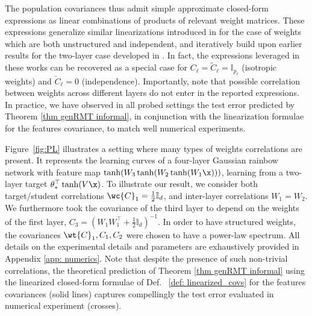 The population covariances thus admit simple approximate closed-form expressions as linear combinations of products of relevant weight matrices. These expressions generalize similar linearizations introduced in \cite{Cui2023,schroder2023deterministic, bosch2023precise, Fan2020SpectraOT,2306.05850} for the case of weights which are both unstructured and independent, and iteratively build upon earlier results for the two-layer case developed in \cite{Mei2019TheGE, Gerace2020GeneralisationEI, Goldt2021TheGE, Hu2020UniversalityLF}.  In fact, the expressions leveraged in these works can be recovered as a special case for $C_\ell=\tilde{C}_\ell=\mathbb{I}_{p_\ell}$ (isotropic weights) and $\check{C}_\ell=0$ (independence). Importantly, note that possible correlation between weights across different layers do not enter in the reported expressions. In practice, we have observed in all probed settings the test error predicted by Theorem \ref{thm genRMT informal}, in conjunction with the linearization formulae for the features covariance, to match well numerical experiments. 

Figure \,\ref{fig:PL} illustrates a setting where many types of weights correlations are present. It represents the learning curves of a four-layer Gaussian rainbow network with feature map $\tanh(W_3\tanh(W_2\tanh(W_1\x)))$, learning from a two-layer target $\theta_*^\top \tanh(V\x)$. 
To illustrate our result, we consider both target/student correlations $\wc{C}_1=\frac{1}{2}\mathbb{I}_d$, and inter-layer correlations $W_1=W_2$. 
We furthermore took the covariance of the third layer to depend on the weights of the first layer, $C_3=(W_1W_1^\top+\frac{1}{2}\mathbb{I}_d)^{-1}$. 
In order to have structured weights, the covariances $\wt{C}_1, C_1,C_2$ were chosen to have a power-law spectrum. 
All details on the experimental details and parameters are exhaustively provided in Appendix \ref{app: numerics}. 
Note that despite the presence of such non-trivial correlations, the theoretical prediction of Theorem \ref{thm genRMT informal} using the linearized closed-form formulae of Def.
~\ref{def: linearized_covs} for the features covariances (solid lines) captures compellingly the test error evaluated in numerical experiment (crosses).

